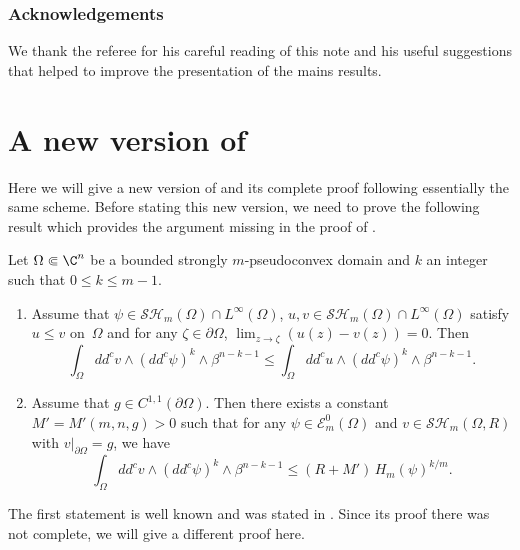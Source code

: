 \subsubsection*{Acknowledgements}
We thank the referee for his careful reading of this note and his useful suggestions that helped to improve the presentation of the mains results.

\section{A new version of \texorpdfstring{\cite[Lem.\,4.2]{BZ20}}{BZ20}}

Here we will give a new version of \cite[Lem.\,4.2]{BZ20} and its complete proof following essentially the same scheme. Before stating this new version, we need to prove the following result which provides the argument missing in the proof of \cite[Lem.\,4.2]{BZ20}.

\begin{lemma} \label{lem:claim2}
Let $\Omega \Subset \C^n$ be a bounded strongly $m$-pseudoconvex domain and $k$ an integer such that $0 \leq k \leq m-1$.
\begin{enumerate}
\item
Assume that $\psi \in \mathcal{SH}_m (\Omega) \cap L^{\infty} (\Omega)$, $u,v\in \mathcal{SH}_m(\Omega)\cap L^{\infty}(\Omega)$ satisfy $u \leq v$ on~$\Omega$ and for any $\zeta \in \partial \Omega$, $\lim_{z \rightarrow \zeta }(u(z)- v(z))= 0$.
Then
\begin{equation} \label{eq:claim1}
\int_{\Omega} dd^c v \wedge (dd^c \psi)^{k} \wedge\beta^{n-k-1} \leq \int_{\Omega} dd^c u \wedge (dd^c \psi)^k \wedge\beta^{n-k-1}.
\end{equation}

\item
Assume that $g \in C^{1,1} (\partial \Omega)$. Then there exists a constant $ M' = M'(m,n,g) > 0$ such that for any $\psi \in \mathcal{E}^0_m (\Omega)$ and $v \in \mathcal{SH}_m (\Omega,R)$ with $v|_{\partial \Omega} = g$, we have
\begin{equation} \label{eq:claim2}
\int_{\Omega} dd^c v \wedge(dd^c \psi)^k\wedge\beta^{n-k-1} \leq (R + M') \, H_m(\psi)^{k\slash m} .
\end{equation}
\end{enumerate}
\end{lemma}
The first statement is well known and was stated in \cite[Cor.\,2.9]{BZ20}. Since its proof there was not complete, we will give a different proof here.

